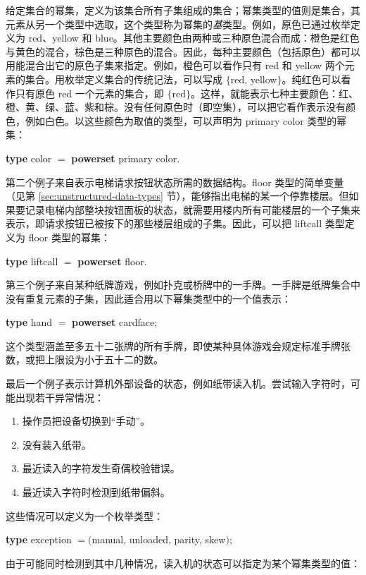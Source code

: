 \documentclass[twoside,11pt,fontset=none]{ctexbook}
\begin{document}
给定集合的幂集，定义为该集合所有子集组成的集合；幂集类型的值则是集合，其元素从另一个类型中选取，这个类型称为幂集的\textit{基}类型。例如，原色已通过枚举定义为 red、yellow 和 blue。其他主要颜色由两种或三种原色混合而成：橙色是红色与黄色的混合，棕色是三种原色的混合。因此，每种主要颜色（包括原色）都可以用能混合出它的原色子集来指定。例如，橙色可以看作只有 red 和 yellow 两个元素的集合。用枚举定义集合的传统记法，可以写成 $\{$red, yellow$\}$。纯红色可以看作只有原色 red 一个元素的集合，即 $\{$red$\}$。这样，就能表示七种主要颜色：红、橙、黄、绿、蓝、紫和棕。没有任何原色时（即空集），可以把它看作表示没有颜色，例如白色。以这些颜色为取值的类型，可以声明为 primary color 类型的幂集：

\quad \textbf{type} color $=$ \textbf{powerset} primary color.

第二个例子来自表示电梯请求按钮状态所需的数据结构。floor 类型的简单变量（见第 \ref{sec:unstructured-data-types} 节），能够指出电梯的某一个停靠楼层。但如果要记录电梯内部整块按钮面板的状态，就需要用楼内所有可能楼层的一个子集来表示，即请求按钮已被按下的那些楼层组成的子集。因此，可以把 liftcall 类型定义为 floor 类型的幂集：

\quad \textbf{type} liftcall $=$ \textbf{powerset} floor.

第三个例子来自某种纸牌游戏，例如扑克或桥牌中的一手牌。一手牌是纸牌集合中没有重复元素的子集，因此适合用以下幂集类型中的一个值表示：

\quad \textbf{type} hand $=$ \textbf{powerset} cardface;

\noindent
这个类型涵盖至多五十二张牌的所有手牌，即使某种具体游戏会规定标准手牌张数，或把上限设为小于五十二的数。

最后一个例子表示计算机外部设备的状态，例如纸带读入机。尝试输入字符时，可能出现若干异常情况：

\begin{enumerate}[wide, nosep, label=(\arabic*)]
	\item 操作员把设备切换到“手动”。
	\item 没有装入纸带。
	\item 最近读入的字符发生奇偶校验错误。
	\item 最近读入字符时检测到纸带偏斜。
\end{enumerate}

\noindent
这些情况可以定义为一个枚举类型：

\quad \textbf{type} exception $= ($manual, unloaded, parity, skew$)$; 

\noindent
由于可能同时检测到其中几种情况，读入机的状态可以指定为某个幂集类型的值：
\end{document}
